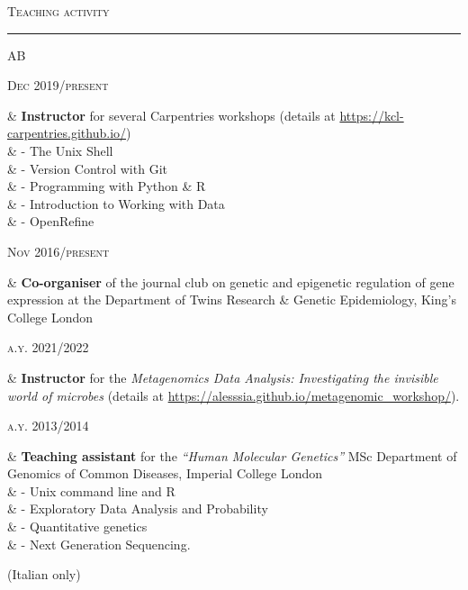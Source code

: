 \documentclass[a4paper,10pt]{article}
\newcommand{\mediumtitle}[1]{
	\vspace{0.2cm}
	{\noindent
	\Large \textsc{#1}\\[-2ex]
	\hrule
	\vspace{0.2cm}}
}
\newenvironment{doubletablelist}
{
	\vspace{-0.2cm}
	\begin{longtable}[!h]{AB}}{\end{longtable}
}
\newcommand{\dtlist}[2]{
\hspace{-3cm}
\noindent
	\begin{minipage}{0.22\textwidth}
	\begin{flushright}
	\textsc{#1}
	\end{flushright}
	\end{minipage}
	& #2\\[0.2cm]
}
\begin{document}
\mediumtitle{Teaching activity}
\begin{doubletablelist}
	
	\dtlist{Dec 2019/present}{\textbf{Instructor} for several Carpentries workshops (details at \url{https://kcl-carpentries.github.io/})\\
							& \hskip1cm - The Unix Shell\\
							& \hskip1cm - Version Control with Git\\
							& \hskip1cm - Programming with Python \& R\\
							& \hskip1cm - Introduction to Working with Data \\
							& \hskip1cm - OpenRefine}
	
	\dtlist{Nov 2016/present}{\textbf{Co-organiser} of the journal club on genetic and epigenetic regulation of gene expression at the Department of Twins Research \& Genetic Epidemiology, King's College London}
	
	\dtlist{a.y. 2021/2022}{\textbf{Instructor} for the \emph{Metagenomics Data Analysis: Investigating the invisible world of microbes} (details at \url{https://alesssia.github.io/metagenomic_workshop/}).}
	
	\dtlist{a.y. 2013/2014}{\textbf{Teaching assistant} for the \emph{``Human Molecular Genetics''} MSc Department of Genomics of Common Diseases, Imperial College London\\
							& \hskip1cm - Unix command line and R\\
							& \hskip1cm - Exploratory Data Analysis and Probability\\
							& \hskip1cm - Quantitative genetics\\
							& \hskip1cm - Next Generation Sequencing.}					
\end{doubletablelist}							

{\footnotesize \noindent (Italian only)}
\end{document}
